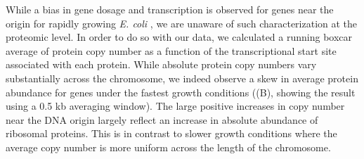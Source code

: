 While a bias in gene dosage and transcription is observed for genes near the
origin for rapidly growing \textit{E. coli}  \citep{scholz2019}, we are unaware
of such characterization at the proteomic level. In order to do so with our
data, we calculated a running boxcar average of protein copy number as a
function of the transcriptional start site associated with each protein. While
absolute protein copy numbers vary substantially across the chromosome, we
indeed observe a skew in average protein abundance for genes under the fastest
growth conditions ((B), showing the result using a 0.5 kb
averaging window). The large positive increases in copy number near the DNA origin
largely reflect an increase in absolute abundance of ribosomal proteins.
This is in contrast to slower growth conditions where the
average copy number is more uniform across the length of the chromosome.

